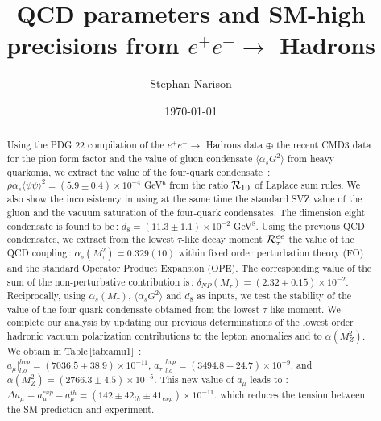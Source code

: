 \documentclass[review]{elsarticle}
\def\la{\langle}
\def\ra{\rangle}
\begin{document}
\begin{frontmatter}

\title{QCD parameters and SM-high precisions from $e^+e^-\to$  Hadrons}
\author{Stephan Narison%
}
\address{Laboratoire
Univers et Particules de Montpellier (LUPM), CNRS-IN2P3, \\
Case 070, Place Eug\`ene
Bataillon, 34095 - Montpellier, France\\
and\\
Institute of High-Energy Physics of Madagascar (iHEPMAD)\\
University of Ankatso, Antananarivo 101, Madagascar}





\date{\today}
\begin{abstract}
\noindent
Using the PDG 22 compilation of the $e^+e^-\to$  Hadrons data $\oplus$ the recent CMD3 data for the pion form factor and the value of gluon condensate $\la\alpha_s G^2\ra$ from heavy quarkonia, we extract the value of the four-quark condensate
\,:  $\rho\alpha_s\la\bar\psi\psi\ra^2= (5.9\pm 0.4)\times 10^{-4}$ GeV$^6$ from the ratio ${\cal R}_{10}$ of Laplace sum rules.  We also show the inconsistency in using at the same time the standard SVZ value of the gluon and the vacuum saturation of the four-quark condensates.  The dimension eight condensate is found to be\,: $d_8= (11.3\pm 1.1)\times 10^{-2}$ GeV$^8$. Using the previous QCD condensates, we extract  from the lowest $\tau$-like decay moment ${\cal R}_\tau^{ee}$ the value of the QCD coupling\,: $\alpha_s(M^2_\tau)=0.329(10)$ within fixed order perturbation theory (FO) and the standard Operator Product Expansion (OPE). The corresponding value of the sum of the non-perturbative contribution is\,: $\delta_{NP}(M_\tau)=(2.32\pm 0.15)\times 10^{-2}$. Reciprocally, using $\alpha_s(M_\tau)$, $\la\alpha_s G^2\ra$ and $d_8$ as inputs, we test the stability of the value of the four-quark condensate obtained from the lowest $\tau$-like moment. 
We complete our analysis by updating our previous determinations of the lowest order hadronic vacuum polarization  contributions to the lepton anomalies and to $\alpha(M^2_Z)$.  We obtain in Table\,\ref{tab:amu1} \,:
$a_\mu\vert^{hvp}_{l.o}= (7036.5\pm 38.9)\times10^{-11}, \, a_\tau\vert^{hvp}_{l.o}= (3494.8\pm 24.7)\times10^{-9} $. and $\alpha(M^2_Z)=(2766.3\pm 4.5)\times 10^{-5}$. This new value of $a_\mu$ leads to : $\Delta a_\mu\equiv a_\mu^{exp}-a_\mu^{th} = (142\pm 42_{th}\pm 41_{exp})\times 10^{-11}$. which reduces the tension between the SM prediction and experiment.


\end{abstract}
\end{frontmatter}
\end{document}
